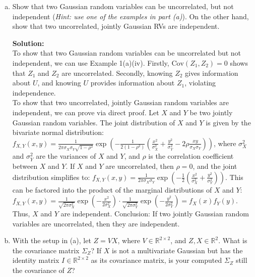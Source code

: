 \documentclass{article}
\newenvironment{solution}{\color{blue} \smallskip \textbf{Solution:}}{}
\begin{document}
\begin{enumerate}[(a)]
\begin{solution}
    \end{solution}

    \newpage
    \item Show that two Gaussian random variables can be uncorrelated, but not independent (\textit{Hint: use one of the examples in part (a)}). On the other hand, show that two uncorrelated, jointly Gaussian RVs are independent. 

    \begin{solution}\\
To show that two Gaussian random variables can be uncorrelated but not independent, we can use Example 1(a)(iv). Firstly, \(\text{Cov}(Z_1, Z_2) = 0\) shows that \(Z_1\) and \(Z_2\) are uncorrelated. Secondly, knowing \(Z_2\) gives information about \(U\), and knowing \(U\) provides information about \(Z_1\), violating independence.\\

To show that two uncorrelated, jointly Gaussian random variables are independent, we can prove via direct proof. Let \(X\) and \(Y\) be two jointly Gaussian random variables. The joint distribution of \(X\) and \(Y\) is given by the bivariate normal distribution: \(f_{X,Y}(x,y) = \frac{1}{2\pi \sigma_X \sigma_Y \sqrt{1 - \rho^2}} \exp \left( - \frac{1}{2(1 - \rho^2)} \left( \frac{x^2}{\sigma_X^2} + \frac{y^2}{\sigma_Y^2} - 2 \rho \frac{xy}{\sigma_X \sigma_Y} \right) \right)\), where \(\sigma_X^2\) and \(\sigma_Y^2\) are the variances of \(X\) and \(Y\), and \(\rho\) is the correlation coefficient between \(X\) and \(Y\). If \(X\) and \(Y\) are uncorrelated, then \(\rho = 0\), and the joint distribution simplifies to: \(f_{X,Y}(x,y) = \frac{1}{2\pi \sigma_X \sigma_Y} \exp \left( -\frac{1}{2} \left( \frac{x^2}{\sigma_X^2} + \frac{y^2}{\sigma_Y^2} \right) \right)\). This can be factored into the product of the marginal distributions of \(X\) and \(Y\): \(f_{X,Y}(x,y) = \frac{1}{\sqrt{2 \pi \sigma_X^2}} \exp \left( - \frac{x^2}{2 \sigma_X^2} \right) \cdot \frac{1}{\sqrt{2 \pi \sigma_Y^2}} \exp \left( - \frac{y^2}{2 \sigma_Y^2} \right) = f_X(x) f_Y(y)\). Thus, \(X\) and \(Y\) are independent. Conclusion: If two jointly Gaussian random variables are uncorrelated, then they are independent.



    \end{solution}

    \newpage
    \item With the setup in (a), let $Z = V X$, where $V \in \mathbb{R}^{2 \times 2}$, and $Z, X \in \mathbb{R}^2$. What is the covariance matrix $\Sigma_Z$? If $X$ is not a multivariate Gaussian but has the identity matrix $I\in\mathbb R^{2\times 2}$ as its covariance matrix, is your computed $\Sigma_Z$ still the covariance of $Z$?


\end{enumerate}
\end{document}
